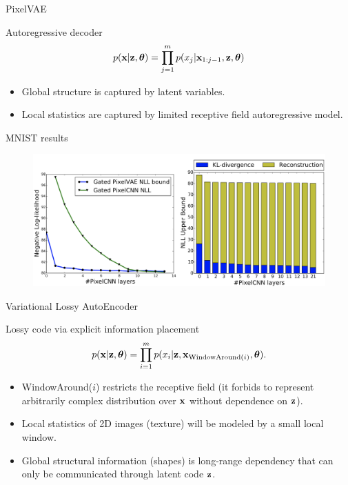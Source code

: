 \documentclass{beamer}
\begin{document}
\begin{frame}{PixelVAE}
	\begin{block}{Autoregressive decoder}
		\vspace{-0.3cm}
		\[
		p(\mathbf{x} | \mathbf{z} , \boldsymbol{\theta}) = \prod_{j=1}^m p(x_j | \mathbf{x}_{1:j - 1}, \mathbf{z} , \boldsymbol{\theta})
		\]
		\vspace{-0.3cm}
	\end{block}
	\begin{itemize}
		\item Global structure is captured by latent variables.
		\item Local statistics are captured by limited receptive field autoregressive model.
	\end{itemize}
	\vspace{-0.1cm}
	\begin{block}{MNIST results}
		\vspace{-0.3cm}
		\begin{figure}
			\centering
			\includegraphics[width=0.75\linewidth]{figs/PixelVAE_2.png}
		\end{figure}
	\end{block}
	
\end{frame}
\begin{frame}{Variational Lossy AutoEncoder}
	\begin{block}{Lossy code via explicit information placement}
		\[
		p(\mathbf{x} | \mathbf{z}, \boldsymbol{\theta}) = \prod_{i=1}^m p(x_i | \mathbf{z}, \mathbf{x}_{\text{WindowAround}(i)}, \boldsymbol{\theta}).
		\]
		\begin{itemize}
			\item WindowAround($i$) restricts the receptive field (it forbids to represent arbitrarily complex distribution over $\mathbf{x}$ without dependence on $\mathbf{z}$). 
			\item Local statistics of 2D images (texture) will be modeled by a small local window.
			\item Global structural information (shapes) is long-range dependency that can only be communicated through latent code $\mathbf{z}$. 
		\end{itemize}
	\end{block}
\end{frame}
\end{document}
